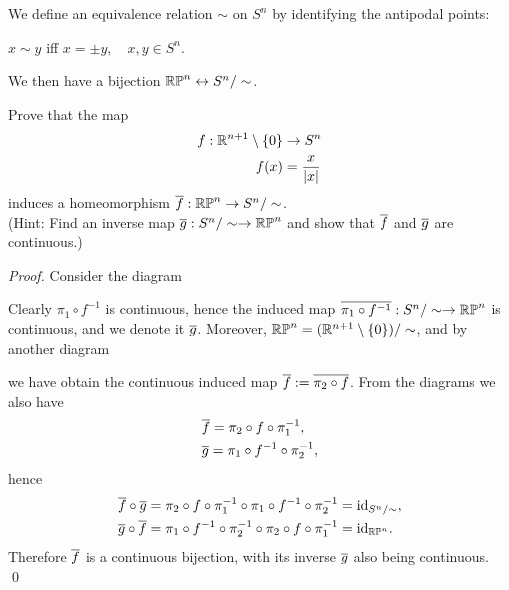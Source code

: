 We define an equivalence relation $\sim$ on $S^n$ by identifying the antipodal points:
\begin{center}
    $x \sim y$ iff $x=\pm y, \quad x,y \in S^n$.
\end{center}
We then have a bijection $\mathbb{RP}^n \leftrightarrow S^n / \sim$.
\begin{exercise}
    Prove that the map
    \begin{align*}
        f:\mathbb{R}^{n+1} \setminus \{0\} &\to S^n \\
        f(x) &= \frac{x}{|x|}
    \end{align*}
    induces a homeomorphism $\overline{f}: \mathbb{RP}^n \to S^n / \sim $. \\
    (Hint: Find an inverse map $\overline{g}: S^n / \sim \to \mathbb{RP}^n$ and show that $\overline{f}$ and $\overline{g}$ are continuous.)
\end{exercise}
\begin{proof}
    Consider the diagram 
    \begin{center}
    \end{center}
    Clearly $\pi_1 \circ f^{-1}$ is continuous, hence the induced map 
    $\overline{\pi_1 \circ f^{-1}}: S^n/\sim \to \mathbb{RP}^n$ is continuous, and we denote it $\overline{g}$. Moreover, $\mathbb{RP}^n = (\mathbb{R}^{n+1} \setminus \{0\}) / \sim $, and by another diagram
    \begin{center}
    \end{center}
we have obtain the continuous induced map $\overline{f}:=\overline{\pi_2 \circ f}$.
From the diagrams we also have 
\begin{align*}
    &\overline{f} = \pi_2 \circ f \circ \pi_1^{-1}, \\
    &\overline{g} = \pi_1 \circ f^{-1} \circ \pi_2^{-1},
\end{align*}
hence 
\begin{align*}
    \overline{f} \circ \overline{g} &= \pi_2 \circ f \circ \pi_1^{-1} \circ \pi_1 \circ f^{-1} \circ \pi_2^{-1} = \mathrm{id}_{S^n/\sim}, \\
    \overline{g} \circ \overline{f} &= \pi_1 \circ f^{-1} \circ \pi_2^{-1} \circ \pi_2 \circ f \circ \pi_1^{-1} = \mathrm{id}_{\mathbb{RP}^n}.
\end{align*}
Therefore $\overline{f}$ is a continuous bijection, with its inverse $\overline{g}$ also being continuous. \qed 
\end{proof}

